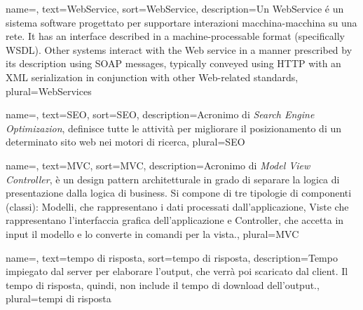 {
	name=,
	text=WebService,
	sort=WebService,
	description={Un WebService é un sistema software progettato per supportare interazioni macchina-macchina su una rete. It has an interface described in a machine-processable format (specifically WSDL). Other systems interact with the Web service in a manner prescribed by its description using SOAP messages, typically conveyed using HTTP with an XML serialization in conjunction with other Web-related standards},
	plural=WebServices
}


{
	name=,
	text=SEO,
	sort=SEO,
	description={Acronimo di \textit{Search Engine Optimizazion}, definisce tutte le attività per migliorare il posizionamento di un determinato sito web nei motori di ricerca},
	plural=SEO
}


{
	name=,
	text=MVC,
	sort=MVC,
	description={Acronimo di \textit{Model View Controller}, è un design pattern architetturale in grado di separare la logica di presentazione dalla logica di business. Si compone di tre tipologie di componenti (classi): Modelli, che rappresentano i dati processati dall'applicazione, Viste che rappresentano l'interfaccia grafica dell'applicazione e Controller, che accetta in input il modello e lo converte in comandi per la vista.},
	plural=MVC
}


{
	name=,
	text=tempo di risposta,
	sort=tempo di risposta,
	description={Tempo impiegato dal server per elaborare l'output, che verrà poi scaricato dal client. Il tempo di risposta, quindi, non include il tempo di download dell'output.},
	plural=tempi di risposta
}